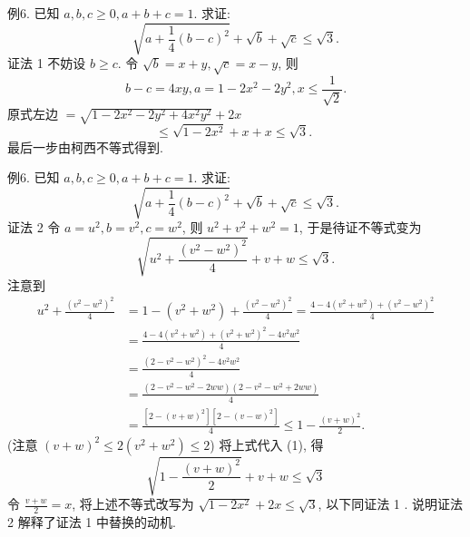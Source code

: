 例6. 已知 $a, b, c \geqslant 0, a+b+c=1$. 求证:
$$
\sqrt{a+\frac{1}{4}(b-c)^2}+\sqrt{b}+\sqrt{c} \leqslant \sqrt{3} .
$$
证法 1 不妨设 $b \geqslant c$. 令 $\sqrt{b}=x+y, \sqrt{c}=x-y$, 则
$$
b-c=4 x y, a=1-2 x^2-2 y^2, x \leqslant \frac{1}{\sqrt{2}} .
$$
原式左边 $=\sqrt{1-2 x^2-2 y^2+4 x^2 y^2}+2 x$
$$
\leqslant \sqrt{1-2 x^2}+x+x \leqslant \sqrt{3} \text {. }
$$
最后一步由柯西不等式得到.



例6. 已知 $a, b, c \geqslant 0, a+b+c=1$. 求证:
$$
\sqrt{a+\frac{1}{4}(b-c)^2}+\sqrt{b}+\sqrt{c} \leqslant \sqrt{3} .
$$
证法 2 令 $a=u^2, b=v^2, c=w^2$, 则 $u^2+v^2+w^2=1$, 于是待证不等式变为
$$
\sqrt{u^2+\frac{\left(v^2-w^2\right)^2}{4}}+v+w \leqslant \sqrt{3} . \label{(1)}
$$
注意到
$$
\begin{aligned}
u^2+\frac{\left(v^2-w^2\right)^2}{4} & =1-\left(v^2+w^2\right)+\frac{\left(v^2-w^2\right)^2}{4}=\frac{4-4\left(v^2+w^2\right)+\left(v^2-w^2\right)^2}{4} \\
& =\frac{4-4\left(v^2+w^2\right)+\left(v^2+w^2\right)^2-4 v^2 w^2}{4} \\
& =\frac{\left(2-v^2-w^2\right)^2-4 v^2 w^2}{4} \\
& =\frac{\left(2-v^2-w^2-2 w w\right)\left(2-v^2-w^2+2 w w\right)}{4} \\
& =\frac{\left[2-(v+w)^2\right]\left[2-(v-w)^2\right]}{4} \leqslant 1-\frac{(v+w)^2}{2} .
\end{aligned}
$$
(注意 $(v+w)^2 \leqslant 2\left(v^2+w^2\right) \leqslant 2$) 将上式代入 (1), 得
$$
\sqrt{1-\frac{(v+w)^2}{2}}+v+w \leqslant \sqrt{3}
$$
令 $\frac{v+w}{2}=x$, 将上述不等式改写为 $\sqrt{1-2 x^2}+2 x \leqslant \sqrt{3}$, 以下同证法 1 . 说明证法 2 解释了证法 1 中替换的动机.



